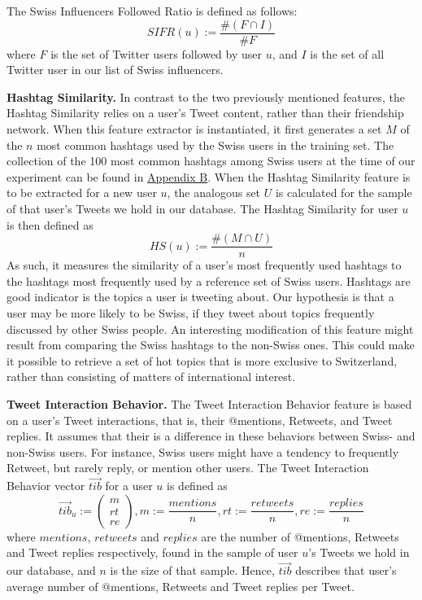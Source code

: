 \documentclass[10pt,a4paper]{article}
\begin{document}
The Swiss Influencers Followed Ratio is defined as follows:
\begin{equation}
SIFR(u) := \frac{\#(F\cap I)}{\#F}
\end{equation}
where $F$ is the set of Twitter users followed by user $u$, and $I$ is the set of all Twitter user in our list of Swiss influencers.

\textbf{Hashtag Similarity.} In contrast to the two previously mentioned features, the Hashtag Similarity relies on a user's Tweet content, rather than their friendship network. When this feature extractor is instantiated, it first generates a set $M$ of the $n$ most common hashtags used by the Swiss users in the training set. The collection of the 100 most common hashtags among Swiss users at the time of our experiment can be found in \hyperref[sec:appendix-hashtags]{Appendix B}. When the Hashtag Similarity feature is to be extracted for a new user $u$, the analogous set $U$ is calculated for the sample of that user's Tweets we hold in our database. The Hashtag Similarity for user $u$ is then defined as
\begin{equation}
HS(u) := \frac{\#(M\cap U)}{n}
\end{equation}
As such, it measures the similarity of a user's most frequently used hashtags to the hashtags most frequently used by a reference set of Swiss users. Hashtags are good indicator is the topics a user is tweeting about. Our hypothesis is that a user may be more likely to be Swiss, if they tweet about topics frequently discussed by other Swiss people. An interesting modification of this feature might result from comparing the Swiss hashtags to the non-Swiss ones. This could make it possible to retrieve a set of hot topics that is more exclusive to Switzerland, rather than consisting of matters of international interest.

\textbf{Tweet Interaction Behavior.} The Tweet Interaction Behavior feature is based on a user's Tweet interactions, that is, their @mentions, Retweets, and Tweet replies. It assumes that their is a difference in these behaviors between Swiss- and non-Swiss users. For instance, Swiss users might have a tendency to frequently Retweet, but rarely reply, or mention other users. The Tweet Interaction Behavior vector $\overrightarrow{tib}$ for a user $u$ is defined as
\begin{equation}
\overrightarrow{tib}_u := 
\begin{pmatrix}
m \\ rt \\ re
\end{pmatrix}, m := \frac{mentions}{n}, rt := \frac{retweets}{n}, re := \frac{replies}{n}
\end{equation}
where $mentions$, $retweets$ and $replies$ are the number of @mentions, Retweets and Tweet replies respectively, found in the sample of user $u$'s Tweets we hold in our database, and $n$ is the size of that sample. Hence, $\overrightarrow{tib}$ describes that user's average number of @mentions, Retweets and Tweet replies per Tweet.
\end{document}
